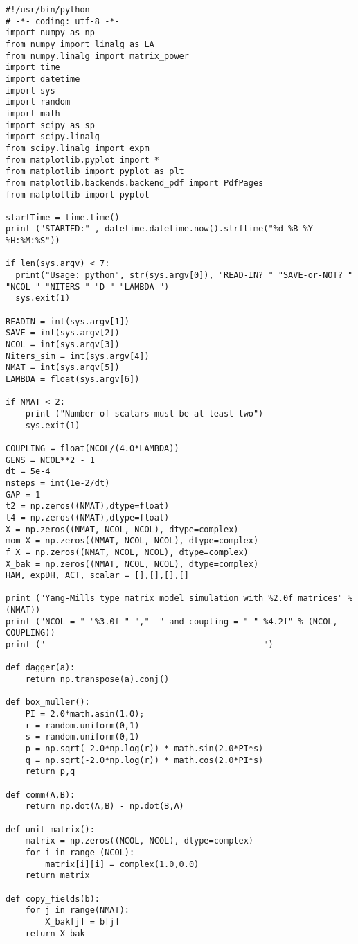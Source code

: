 \begin{lstlisting}
#!/usr/bin/python
# -*- coding: utf-8 -*-
import numpy as np
from numpy import linalg as LA
from numpy.linalg import matrix_power
import time 
import datetime 
import sys
import random
import math
import scipy as sp
import scipy.linalg
from scipy.linalg import expm
from matplotlib.pyplot import *
from matplotlib import pyplot as plt
from matplotlib.backends.backend_pdf import PdfPages
from matplotlib import pyplot

startTime = time.time()
print ("STARTED:" , datetime.datetime.now().strftime("%d %B %Y %H:%M:%S"))

if len(sys.argv) < 7:
  print("Usage: python", str(sys.argv[0]), "READ-IN? " "SAVE-or-NOT? " "NCOL " "NITERS " "D " "LAMBDA ")
  sys.exit(1)

READIN = int(sys.argv[1])
SAVE = int(sys.argv[2])
NCOL = int(sys.argv[3]) 
Niters_sim = int(sys.argv[4]) 
NMAT = int(sys.argv[5])
LAMBDA = float(sys.argv[6])

if NMAT < 2:
    print ("Number of scalars must be at least two")
    sys.exit(1) 

COUPLING = float(NCOL/(4.0*LAMBDA))
GENS = NCOL**2 - 1
dt = 5e-4
nsteps = int(1e-2/dt)
GAP = 1
t2 = np.zeros((NMAT),dtype=float)
t4 = np.zeros((NMAT),dtype=float)
X = np.zeros((NMAT, NCOL, NCOL), dtype=complex)
mom_X = np.zeros((NMAT, NCOL, NCOL), dtype=complex)
f_X = np.zeros((NMAT, NCOL, NCOL), dtype=complex)
X_bak = np.zeros((NMAT, NCOL, NCOL), dtype=complex)
HAM, expDH, ACT, scalar = [],[],[],[]

print ("Yang-Mills type matrix model simulation with %2.0f matrices" % (NMAT)) 
print ("NCOL = " "%3.0f " ","  " and coupling = " " %4.2f" % (NCOL, COUPLING)) 
print ("--------------------------------------------")

def dagger(a):
    return np.transpose(a).conj()

def box_muller():
    PI = 2.0*math.asin(1.0);    
    r = random.uniform(0,1)
    s = random.uniform(0,1)
    p = np.sqrt(-2.0*np.log(r)) * math.sin(2.0*PI*s)
    q = np.sqrt(-2.0*np.log(r)) * math.cos(2.0*PI*s)
    return p,q

def comm(A,B):
    return np.dot(A,B) - np.dot(B,A)

def unit_matrix():
    matrix = np.zeros((NCOL, NCOL), dtype=complex)
    for i in range (NCOL):
        matrix[i][i] = complex(1.0,0.0)
    return matrix

def copy_fields(b):
    for j in range(NMAT):
        X_bak[j] = b[j]
    return X_bak


\end{lstlisting}
